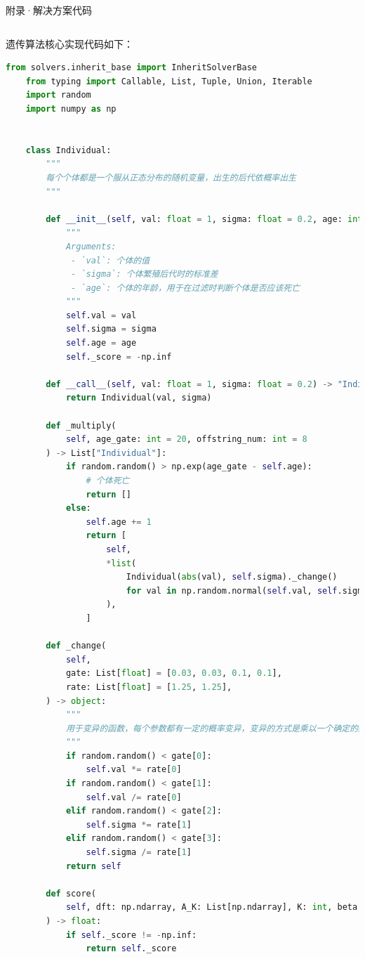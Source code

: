 \documentclass[11pt]{article}
\begin{document}
\begin{section}{附录·解决方案代码}
\begin{lstlisting}[language=Python]
   \end{lstlisting}
 遗传算法核心实现代码如下：
 \begin{lstlisting}[language=Python]
    from solvers.inherit_base import InheritSolverBase
    from typing import Callable, List, Tuple, Union, Iterable
    import random
    import numpy as np
    
    
    class Individual:
        """
        每个个体都是一个服从正态分布的随机变量，出生的后代依概率出生
        """
    
        def __init__(self, val: float = 1, sigma: float = 0.2, age: int = 0) -> None:
            """
            Arguments:
             - `val`: 个体的值
             - `sigma`: 个体繁殖后代时的标准差
             - `age`: 个体的年龄，用于在过滤时判断个体是否应该死亡
            """
            self.val = val
            self.sigma = sigma
            self.age = age
            self._score = -np.inf
    
        def __call__(self, val: float = 1, sigma: float = 0.2) -> "Individual":
            return Individual(val, sigma)
    
        def _multiply(
            self, age_gate: int = 20, offstring_num: int = 8
        ) -> List["Individual"]:
            if random.random() > np.exp(age_gate - self.age):
                # 个体死亡
                return []
            else:
                self.age += 1
                return [
                    self,
                    *list(
                        Individual(abs(val), self.sigma)._change()
                        for val in np.random.normal(self.val, self.sigma, offstring_num)
                    ),
                ]
    
        def _change(
            self,
            gate: List[float] = [0.03, 0.03, 0.1, 0.1],
            rate: List[float] = [1.25, 1.25],
        ) -> object:
            """
            用于变异的函数，每个参数都有一定的概率变异，变异的方式是乘以一个确定的数
            """
            if random.random() < gate[0]:
                self.val *= rate[0]
            if random.random() < gate[1]:
                self.val /= rate[0]
            elif random.random() < gate[2]:
                self.sigma *= rate[1]
            elif random.random() < gate[3]:
                self.sigma /= rate[1]
            return self
    
        def score(
            self, dft: np.ndarray, A_K: List[np.ndarray], K: int, beta: float
        ) -> float:
            if self._score != -np.inf:
                return self._score
    

\end{lstlisting}
\end{section}
\end{document}
